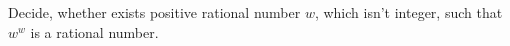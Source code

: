 Decide, whether exists positive rational number $w$, which isn't integer, such that $w^w$ is a rational number.